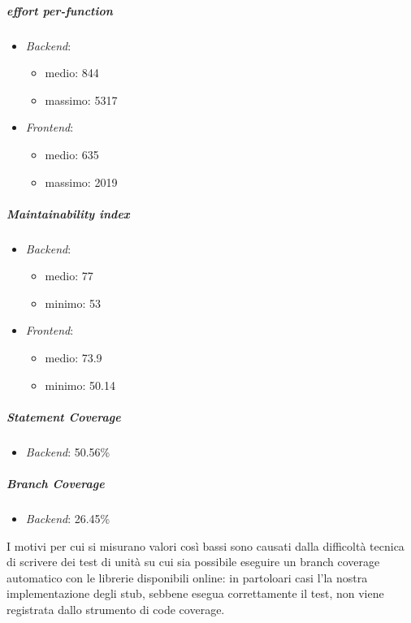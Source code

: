	\subparagraph{ effort per-function}
	\begin{itemize}
		\item \emph{Backend}: 
		\begin{itemize}
			\item medio: 844
			\item massimo: 5317
		\end{itemize}
		\item \emph{Frontend}: 
		\begin{itemize}
			\item medio: 635
			\item massimo: 2019
		\end{itemize} 
	\end{itemize}


	\subparagraph{Maintainability index}
	\begin{itemize}
		\item \emph{Backend}: 
		\begin{itemize}
			\item medio: 77
			\item minimo: 53
		\end{itemize} 
		\item \emph{Frontend}: 
		\begin{itemize}
			\item medio: 73.9
			\item minimo: 50.14
		\end{itemize} 
	\end{itemize}


	\subparagraph{Statement Coverage}
	\begin{itemize}
		\item \emph{Backend}: 50.56\%
	\end{itemize}
	

	\subparagraph{Branch Coverage}
	\begin{itemize}
		\item \emph{Backend}: 26.45\%
	\end{itemize}

	I motivi per cui si misurano valori così bassi sono causati dalla difficoltà tecnica di scrivere dei test di unità su cui sia possibile eseguire un branch coverage automatico con le librerie disponibili online: in partoloari casi l'la nostra implementazione degli stub, sebbene esegua correttamente il test, non viene registrata dallo strumento di code coverage.


